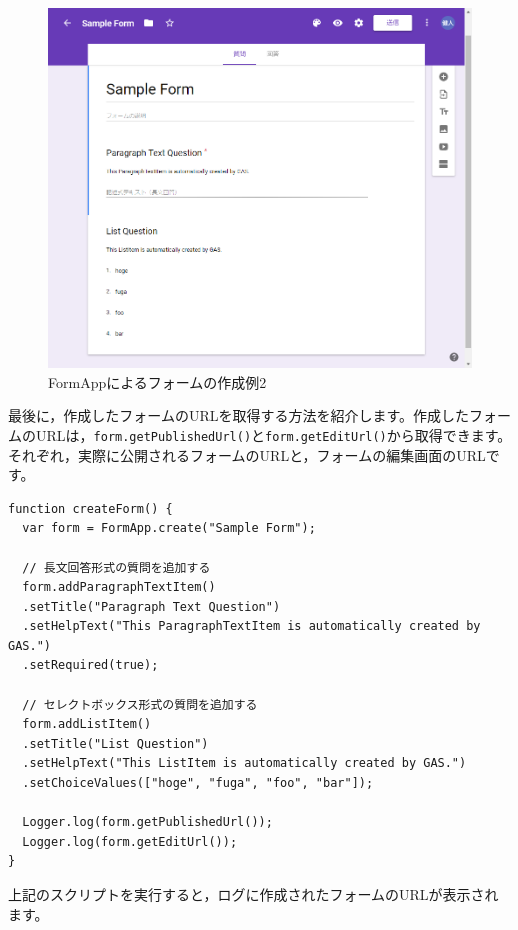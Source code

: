 \documentclass[uplatex,a4j]{jsarticle}
\begin{document}
\begin{figure}[H]
 \centering
 \includegraphics[keepaspectratio, scale=0.5]{images/form_sample3.png}
 \caption{FormAppによるフォームの作成例2}
 \label{fig:form_sample3}
\end{figure}

最後に，作成したフォームのURLを取得する方法を紹介します。作成したフォームのURLは，\verb|form.getPublishedUrl()|と\verb|form.getEditUrl()|から取得できます。それぞれ，実際に公開されるフォームのURLと，フォームの編集画面のURLです。

\begin{lstlisting}[basicstyle=\ttfamily\footnotesize,frame=single,caption=FormApp sample 6]
function createForm() {
  var form = FormApp.create("Sample Form");
  
  // 長文回答形式の質問を追加する
  form.addParagraphTextItem()
  .setTitle("Paragraph Text Question")
  .setHelpText("This ParagraphTextItem is automatically created by GAS.")
  .setRequired(true);
  
  // セレクトボックス形式の質問を追加する
  form.addListItem()
  .setTitle("List Question")
  .setHelpText("This ListItem is automatically created by GAS.")
  .setChoiceValues(["hoge", "fuga", "foo", "bar"]);
  
  Logger.log(form.getPublishedUrl());
  Logger.log(form.getEditUrl());
}
\end{lstlisting}

上記のスクリプトを実行すると，ログに作成されたフォームのURLが表示されます。
\end{document}
